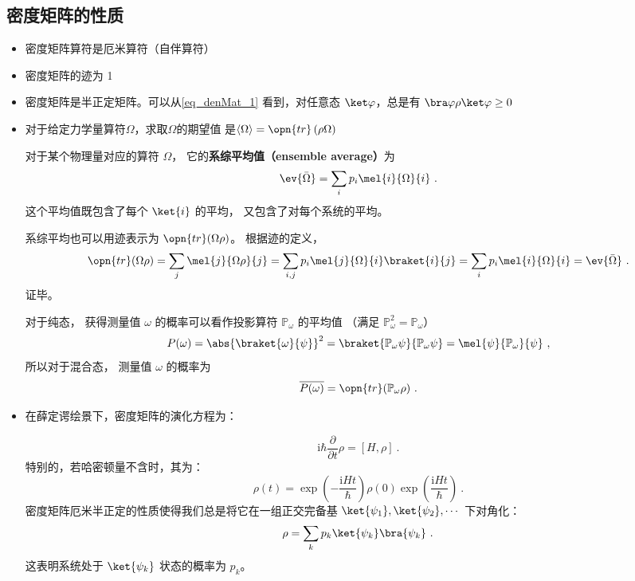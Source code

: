 \subsection{密度矩阵的性质}
\begin{itemize}
\item 密度矩阵算符是厄米算符（自伴算符）

\item 密度矩阵的迹为 1

\item 密度矩阵是半正定矩阵。可以从\autoref{eq_denMat_1} 看到，对任意态 $\ket\varphi$，总是有 
    $\bra\varphi \rho \ket\varphi\ge 0$
\item 对于给定力学量算符$\Omega$，求取$\Omega$的期望值
    是$\left\langle \Omega \right\rangle = \opn{tr}\left(\rho\Omega\right)$
    
    对于某个物理量对应的算符 $\Omega$， 它的\textbf{系综平均值（ensemble average）}为
    \begin{equation}
    \ev{\bar\Omega} = \sum_i p_i \mel{i}{\Omega}{i}~.
    \end{equation}
    这个平均值既包含了每个 $\ket{i}$ 的平均， 又包含了对每个系统的平均。

    系综平均也可以用迹表示为 $\opn{tr}(\Omega\rho)$。 根据迹的定义，
    \begin{equation}\label{eq_denMat_3}
    \opn{tr}(\Omega\rho) = \sum_j \mel{j}{\Omega\rho}{j} = \sum_{i,j} p_i\mel{j}{\Omega}{i} \braket{i}{j} = \sum_{i} p_i\mel{i}{\Omega}{i} = \ev{\bar\Omega}~.
    \end{equation}
    证毕。

    对于纯态， 获得测量值 $\omega$ 的概率可以看作投影算符 $\mathbb P_\omega$ 的平均值
    （满足 $\mathbb P_\omega^2 = \mathbb P_\omega$）
    \begin{equation}
    P(\omega) = \abs{\braket{\omega}{\psi}}^2 = \braket{\mathbb P_\omega \psi}{\mathbb P_\omega \psi} = \mel{\psi}{\mathbb P_\omega}{\psi}~,
    \end{equation}
    所以对于混合态， 测量值 $\omega$ 的概率为
    \begin{equation}
\overline{P(\omega)} = \opn{tr}(\mathbb P_\omega\rho)~.
\end{equation}

\item 在薛定谔绘景下，密度矩阵的演化方程为：

    $$\mathrm{i}\hbar \frac{\partial}{\partial t} \rho= \left[ H, \rho \right]~.$$
    特别的，若哈密顿量不含时，其为：
    $$\rho \left( t \right) = \exp\left(-\frac{\mathrm{i}Ht}{\hbar}\right) \rho \left(0\right) \exp\left(\frac{\mathrm{i}Ht}{\hbar}\right)~.$$
    密度矩阵厄米半正定的性质使得我们总是将它在一组正交完备基 $\ket{\psi_1},\ket{\psi_2},\cdots$ 下对角化：
    \begin{equation}
    \rho = \sum\limits_k p_k\ket{\psi_k} \bra{\psi_k}~.
    \end{equation}
    这表明系统处于 $\ket{\psi_k}$ 状态的概率为 $p_k$。


\end{itemize}
